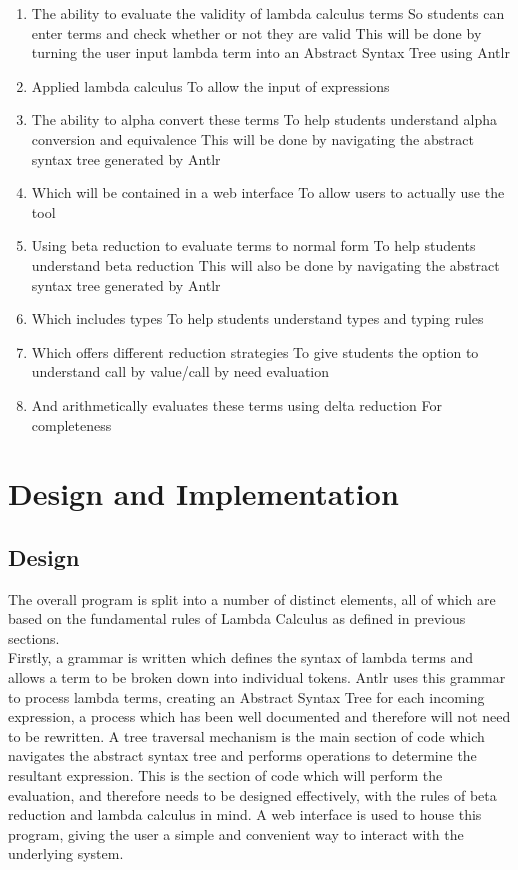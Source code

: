 \documentclass[a4paper,12pt]{report}
\begin{document}
\begin{enumerate}
	\item The ability to evaluate the validity of lambda calculus terms
	\subitem So students can enter terms and check whether or not they are valid
	\subitem This will be done by turning the user input lambda term into an Abstract Syntax Tree using Antlr
	\item Applied lambda calculus
	\subitem To allow the input of expressions
	\item The ability to alpha convert these terms
	\subitem To help students understand alpha conversion and equivalence
	\subitem This will be done by navigating the abstract syntax tree generated by Antlr
	\item Which will be contained in a web interface 
	\subitem To allow users to actually use the tool
	\item Using beta reduction to evaluate terms to normal form
	\subitem To help students understand beta reduction
	\subitem This will also be done by navigating the abstract syntax tree generated by Antlr
	\item Which includes types
	\subitem To help students understand types and typing rules
	\item Which offers different reduction strategies
	\subitem To give students the option to understand call by value/call by need evaluation
	\item And arithmetically evaluates these terms using delta reduction
	\subitem For completeness
	
\end{enumerate}

\chapter{Design and Implementation}
\section{Design}

The overall program is split into a number of distinct elements, all of which are based on the fundamental rules of Lambda Calculus as defined in previous sections.\\

Firstly, a grammar is written which defines the syntax of lambda terms and allows a term to be broken down into individual tokens. Antlr uses this grammar to process lambda terms, creating an Abstract Syntax Tree for each incoming expression\cite{Parr2012}, a process which has been well documented and therefore will not need to be rewritten. A tree traversal mechanism is the main section of code which navigates the abstract syntax tree and performs operations to determine the resultant expression. This is the section of code which will perform the evaluation, and therefore needs to be designed effectively, with the rules of beta reduction and lambda calculus in mind. A web interface is used to house this program, giving the user a simple and convenient way to interact with the underlying system.\\
\end{document}
